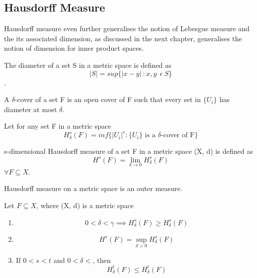 

\subsection{Hausdorff Measure}
Hausdorff measure even further generalises the notion of Lebesgue measure and
the its associated dimension, as discussed in the next chapter, generalises the
notion of dimension for inner product spaces.
\begin{definition}
    The diameter of a set S in a metric space is defined as
    \[
        |S| = sup\{|x-y| \: : x,y \:  \: \epsilon \: S \}
    \]
    .
\end{definition}
\begin{definition}
    A $\delta$-cover of a set F is an open cover of F such that every set in
    $\{U_i\}$ has diameter at most $\delta$.
\end{definition}
Let for any set F in a metric space
\[
    H_\delta^s(F) = inf\{|U_i|^s : \{U_i\} \text{ is a $\delta$-cover of F} \}
\]
\begin{definition}
    s-dimensional Hausdorff measure of a set F in a metric space (X, d) is 
    defined as
    \[
        H^s(F) = \lim_{\delta \to 0} H_\delta^s(F)
    \]
    $\forall F \subseteq X$.
\end{definition}
\begin{theorem}
    Hausdorff measure on a metric space is an outer measure.
\end{theorem}
\begin{theorem}\label{thm_haus_mea_lim}
    Let $F \subseteq X$, where (X, d) is a metric space
    \begin{enumerate}
        \item \[
                0 < \delta < \gamma \implies H_\delta^s (F) \geqslant
                H_\delta^s (F) 
            \]
        \item \[
                H^s (F) = \sup_{\delta > 0} H_\delta^s(F)
            \]
        \item If $0 < s < t$ and $0 < \delta < $, then
            \[
                H_\delta^t(F) \leqslant H_\delta^t(F)
            \]
    \end{enumerate}
\end{theorem}
